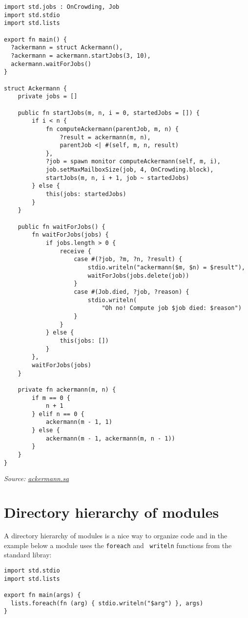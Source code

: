 \begin{verbatim}
import std.jobs : OnCrowding, Job
import std.stdio
import std.lists

export fn main() {
  ?ackermann = struct Ackermann(),
  ?ackermann = ackermann.startJobs(3, 10),
  ackermann.waitForJobs()
}

struct Ackermann {
    private jobs = []

    public fn startJobs(m, n, i = 0, startedJobs = []) {
        if i < n {
            fn computeAckermann(parentJob, m, n) {
                ?result = ackermann(m, n),
                parentJob <| #(self, m, n, result)
            },
            ?job = spawn monitor computeAckermann(self, m, i),
            job.setMaxMailboxSize(job, 4, OnCrowding.block),
            startJobs(m, n, i + 1, job ~ startedJobs)
        } else {
            this(jobs: startedJobs)
        }
    }

    public fn waitForJobs() {
        fn waitForJobs(jobs) {
            if jobs.length > 0 {
                receive {
                    case #(?job, ?m, ?n, ?result) {
                        stdio.writeln("ackermann($m, $n) = $result"),
                        waitForJobs(jobs.delete(job))
                    }
                    case #(Job.died, ?job, ?reason) {
                        stdio.writeln(
                            "Oh no! Compute job $job died: $reason")
                    }
                }
            } else {
                this(jobs: [])
            }
        },
        waitForJobs(jobs)
    }

    private fn ackermann(m, n) {
        if m == 0 {
            n + 1
        } elif n == 0 {
            ackermann(m - 1, 1)
        } else {
            ackermann(m - 1, ackermann(m, n - 1))
        }
    }
}
\end{verbatim}

\emph{Source: \href{../grammar/ackermann.sa}{ackermann.sa}}

\hypertarget{directory-hierarchy-of-modules}{%
\section{Directory hierarchy of
modules}\label{directory-hierarchy-of-modules}}

A directory hierarchy of modules is a nice way to organize code and in
the example below a module uses the \texttt{foreach} and
\texttt{\ writeln} functions from the standard libray:

\begin{verbatim}
import std.stdio
import std.lists

export fn main(args) {
  lists.foreach(fn (arg) { stdio.writeln("$arg") }, args)
}
\end{verbatim}

